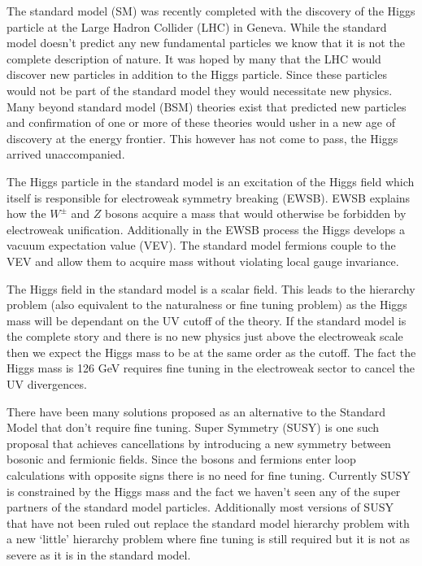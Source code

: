 
The standard model (SM) was recently completed with the discovery of the Higgs particle at the Large Hadron Collider (LHC) in Geneva.
While the standard model doesn't predict any new fundamental particles we know that it is not the complete description of nature.
It was hoped by many that the LHC would discover new particles in addition to the Higgs particle.
Since these particles would not be part of the standard model they would necessitate new physics.
Many beyond standard model (BSM) theories exist that predicted new particles and confirmation of one or more of these theories would usher in a new age of discovery at the energy frontier. 
This however has not come to pass, the Higgs arrived unaccompanied.

The Higgs particle in the standard model is an excitation of the Higgs field which itself is responsible for electroweak symmetry breaking (EWSB).
EWSB explains how the $W^{\pm}$ and $Z$ bosons acquire a mass that would otherwise be forbidden by electroweak unification.
Additionally in the EWSB process the Higgs develops a vacuum expectation value (VEV).
The standard model fermions couple to the VEV and allow them to acquire mass without violating local gauge invariance.

The Higgs field in the standard model is a scalar field.
This leads to the hierarchy problem (also equivalent to the naturalness or fine tuning problem) as the Higgs mass will be dependant on the UV cutoff of the theory.
If the standard model is the complete story and there is no new physics just above the electroweak scale then we expect the Higgs mass to be at the same order as the cutoff.
The fact the Higgs mass is 126 GeV requires fine tuning in the electroweak sector to cancel the UV divergences.

There have been many solutions proposed as an alternative to the Standard Model that don't require fine tuning.
Super Symmetry (SUSY) is one such proposal that achieves cancellations by introducing a new symmetry between bosonic and fermionic fields.
Since the bosons and fermions enter loop calculations with opposite signs there is no need for fine tuning.
Currently SUSY is constrained by the Higgs mass and the fact we haven't seen any of the super partners of the standard model particles.
Additionally most versions of SUSY that have not been ruled out replace the standard model hierarchy problem with a new  `little' hierarchy problem where fine tuning is still required but it is not as severe as it is in the standard model.

